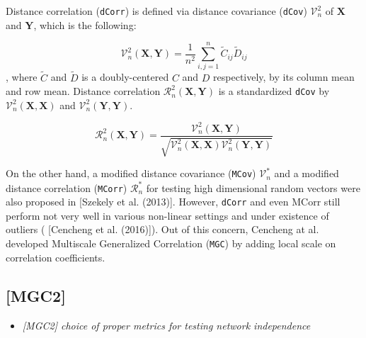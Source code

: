 \documentclass[12pt]{article}
\theoremstyle{definition}
\begin{document}
Distance correlation (\texttt{dCorr}) is defined via distance covariance (\texttt{dCov}) $\mathcal{V}^2_{n}$ of $\boldsymbol{X}$ and $\boldsymbol{Y}$, which is the following: 

\begin{equation}	 
\mathcal{V}^2_{n}(\boldsymbol{X}, \boldsymbol{Y}) = \frac{1}{n^2} \sum\limits_{i,j=1}^{n} \tilde{C}_{ij} \tilde{D}_{ij}
\end{equation}
, where $\tilde{C}$ and $\tilde{D}$ is a doubly-centered $C$ and $D$ respectively, by its column mean and row mean. Distance correlation $\mathcal{R}^{2}_{n}(\boldsymbol{X}, \boldsymbol{Y})$ is a standardized \texttt{dCov} by $\mathcal{V}^2_{n}(\boldsymbol{X}, \boldsymbol{X})$ and $\mathcal{V}^2_{n}(\boldsymbol{Y}, \boldsymbol{Y}).$

\begin{equation}	 
\mathcal{R}_{n}^{2} (\boldsymbol{X}, \boldsymbol{Y}) = \frac{\mathcal{V}^2_{n} (\boldsymbol{X}, \boldsymbol{Y}) }{\sqrt{\mathcal{V}^2_{n} (\boldsymbol{X}, \boldsymbol{X}) \mathcal{V}^2_{n} (\boldsymbol{Y}, \boldsymbol{Y}) } }
\end{equation}
	 
On the other hand, a modified distance covariance (\texttt{MCov}) $\mathcal{V}^*_{n}$ and a modified distance correlation (\texttt{MCorr}) $\mathcal{R}^{*}_{n}$ for testing high dimensional random vectors were also proposed in [Szekely et al. (2013)].  
However, \texttt{dCorr} and even MCorr still perform not very well in various non-linear settings and under existence of outliers ( [Cencheng et al. (2016)]). Out of this concern, Cencheng at al. developed Multiscale Generalized Correlation (\texttt{MGC}) by adding local scale on correlation coefficients. 
	 

\subsection{[MGC2]}
\begin{itemize}
	\item {\it  [MGC2] choice of proper metrics for testing network independence \/}
\end{itemize}
\end{document}
